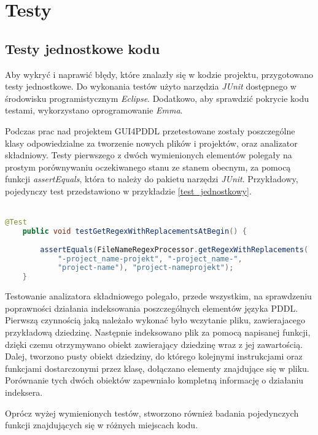 \chapter{Testy}
\label{sec:testy}
\section{Testy jednostkowe kodu}

Aby wykryć i naprawić błędy, które znalazły się w kodzie projektu, przygotowano testy jednostkowe. Do wykonania testów użyto narzędzia \textit{JUnit} dostępnego w środowisku programistycznym \textit{Eclipse}. Dodatkowo, aby sprawdzić pokrycie kodu testami, wykorzystano oprogramowanie \textit{Emma}.

Podczas prac nad projektem GUI4PDDL przetestowane zostały poszczególne klasy odpowiedzialne za tworzenie nowych plików i projektów, oraz analizator składniowy. Testy pierwszego z dwóch wymienionych elementów polegały na prostym porównywaniu oczekiwanego stanu ze stanem obecnym, za pomocą funkcji \textit{assertEquals}, która to należy do pakietu narzędzi \textit{JUnit}. Przykładowy, pojedynczy test przedstawiono w przykładzie \ref{test_jednostkowy}.\\\\
\begin{Code}
\begin{lstlisting}[language=JAVA,frame=single,label={test_jednostkowy}, caption={Przykładowy test jedostkowy}]
	@Test
	public void testGetRegexWithReplacementsAtBegin() {
		
		assertEquals(FileNameRegexProcessor.getRegexWithReplacements(
			"-project_name-projekt", "-project_name-", 
			"project-name"), "project-nameprojekt");
	}
\end{lstlisting}
\end{Code}


Testowanie analizatora składniowego polegało, przede wszystkim, na sprawdzeniu poprawności działania indeksowania poszczególnych elementów języka PDDL. Pierwszą czynnością jaką należało wykonać było wczytanie pliku, zawierajacego przykładową dziedzinę. Następnie indeksowano plik za pomocą napisanej funkcji, dzięki czemu otrzymywano obiekt zawierający dziedzinę wraz z jej zawartością. Dalej, tworzono pusty obiekt dziedziny, do którego kolejnymi instrukcjami oraz funkcjami dostarczonymi przez klasę, dołączano elementy znajdujące się w pliku. Porównanie tych dwóch obiektów zapewniało kompletną informację o działaniu indeksera.

Oprócz wyżej wymienionych testów, stworzono również badania pojedynczych funkcji znajdujących się w różnych miejscach kodu.

